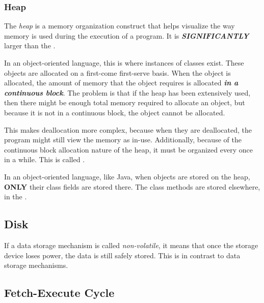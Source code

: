 \subsubsection{Heap}\label{subsubsec:Memory_Heap}
\begin{definition}[Heap]\label{def:Heap}
  The \emph{heap} is a memory organization construct that helps visualize the way memory is used during the execution of a program.
  It is \textbf{\emph{SIGNIFICANTLY}} larger than the .

  In an object-oriented language, this is where instances of classes exist.
  These objects are allocated on a first-come first-serve basis.
  When the object is allocated, the amount of memory that the object requires is allocated \textbf{\emph{in a continuous block}}.
  The problem is that if the heap has been extensively used, then there might be enough total memory required to allocate an object, but because it is not in a continuous block, the object cannot be allocated.

  This makes deallocation more complex, because when they are deallocated, the program might still view the memory as in-use.
  Additionally, because of the continuous block allocation nature of the heap, it must be organized every once in a while.
  This is called .

  \begin{remark}
    In an object-oriented language, like Java, when objects are stored on the heap, \textbf{ONLY} their class fields are stored there.
    The class methods are stored elsewhere, in the .
  \end{remark}
\end{definition}

\subsection{Disk}\label{subsec:Disk}
\begin{definition}\label{def:Non-Volatile}
  If a data storage mechanism is called \emph{non-volatile}, it means that once the storage device loses power, the data is still safely stored.
  This is in contrast to  data storage mechanisms.
\end{definition}

\subsection{Fetch-Execute Cycle}\label{subsec:Fetch_Execute_Cycle}
